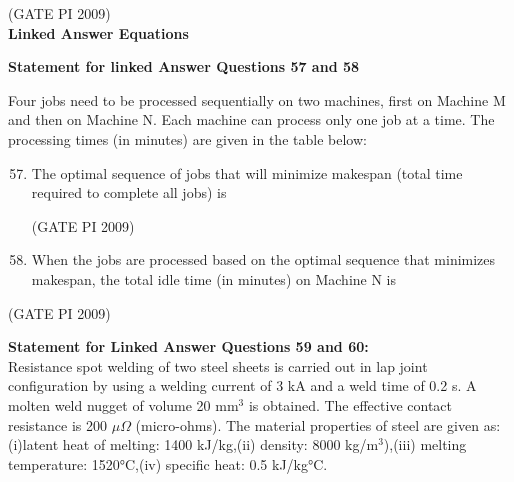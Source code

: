 \documentclass[journal,12pt,onecolumn]{IEEEtran}
\theoremstyle{remark}
\begin{document}
\hfill (GATE PI 2009) \\
\textbf{\large{Linked Answer Equations}}

\textbf{Statement for linked Answer Questions 57 and 58}

 Four jobs need to be processed sequentially on two machines, first on Machine M and then on Machine N. Each machine can process only one job at a time. The processing times (in minutes) are given in the table below:

\begin{enumerate}[label=Q.\arabic*, leftmargin=*]
\setcounter{enumi}{56}
\item The optimal sequence of jobs that will minimize makespan (total time required to complete all jobs) is
\begin{enumerate}[label=(\Alph*)]
\end{enumerate}
\hfill (GATE PI 2009)
\item When the jobs are processed based on the optimal sequence that minimizes makespan, the total idle time (in minutes) on Machine N is
\begin{enumerate}[label=(\Alph*)]
\end{enumerate}
\end{enumerate}
\hfill (GATE PI 2009)

\textbf{Statement for Linked Answer Questions 59 and 60:} \\
Resistance spot welding of two steel sheets is carried out in lap joint configuration by using a welding current of 3 kA and a weld time of 0.2 s. A molten weld nugget of volume 20 mm$^3$ is obtained. The effective contact resistance is 200 $\mu\Omega$ (micro-ohms). The material properties of steel are given as: (i)latent heat of melting: 1400 kJ/kg,(ii) density: 8000 kg/m$^3$),(iii) melting temperature: 1520°C,(iv) specific heat: 0.5 kJ/kg°C.
\end{document}
